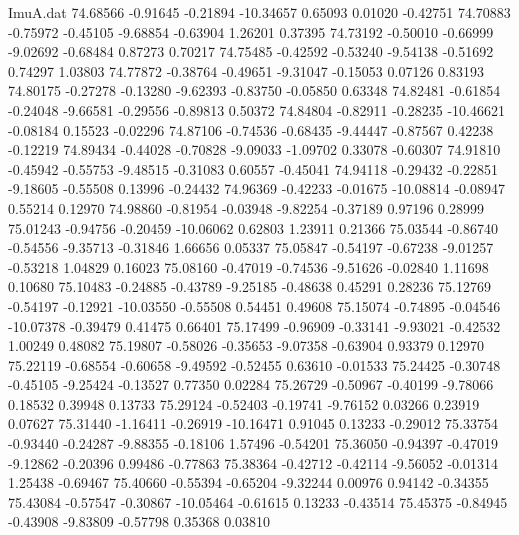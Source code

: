 \begin{filecontents}{ImuA.dat}
  74.68566   -0.91645   -0.21894  -10.34657    0.65093    0.01020   -0.42751
  74.70883   -0.75972   -0.45105   -9.68854   -0.63904    1.26201    0.37395
  74.73192   -0.50010   -0.66999   -9.02692   -0.68484    0.87273    0.70217
  74.75485   -0.42592   -0.53240   -9.54138   -0.51692    0.74297    1.03803
  74.77872   -0.38764   -0.49651   -9.31047   -0.15053    0.07126    0.83193
  74.80175   -0.27278   -0.13280   -9.62393   -0.83750   -0.05850    0.63348
  74.82481   -0.61854   -0.24048   -9.66581   -0.29556   -0.89813    0.50372
  74.84804   -0.82911   -0.28235  -10.46621   -0.08184    0.15523   -0.02296
  74.87106   -0.74536   -0.68435   -9.44447   -0.87567    0.42238   -0.12219
  74.89434   -0.44028   -0.70828   -9.09033   -1.09702    0.33078   -0.60307
  74.91810   -0.45942   -0.55753   -9.48515   -0.31083    0.60557   -0.45041
  74.94118   -0.29432   -0.22851   -9.18605   -0.55508    0.13996   -0.24432
  74.96369   -0.42233   -0.01675  -10.08814   -0.08947    0.55214    0.12970
  74.98860   -0.81954   -0.03948   -9.82254   -0.37189    0.97196    0.28999
  75.01243   -0.94756   -0.20459  -10.06062    0.62803    1.23911    0.21366
  75.03544   -0.86740   -0.54556   -9.35713   -0.31846    1.66656    0.05337
  75.05847   -0.54197   -0.67238   -9.01257   -0.53218    1.04829    0.16023
  75.08160   -0.47019   -0.74536   -9.51626   -0.02840    1.11698    0.10680
  75.10483   -0.24885   -0.43789   -9.25185   -0.48638    0.45291    0.28236
  75.12769   -0.54197   -0.12921  -10.03550   -0.55508    0.54451    0.49608
  75.15074   -0.74895   -0.04546  -10.07378   -0.39479    0.41475    0.66401
  75.17499   -0.96909   -0.33141   -9.93021   -0.42532    1.00249    0.48082
  75.19807   -0.58026   -0.35653   -9.07358   -0.63904    0.93379    0.12970
  75.22119   -0.68554   -0.60658   -9.49592   -0.52455    0.63610   -0.01533
  75.24425   -0.30748   -0.45105   -9.25424   -0.13527    0.77350    0.02284
  75.26729   -0.50967   -0.40199   -9.78066    0.18532    0.39948    0.13733
  75.29124   -0.52403   -0.19741   -9.76152    0.03266    0.23919    0.07627
  75.31440   -1.16411   -0.26919  -10.16471    0.91045    0.13233   -0.29012
  75.33754   -0.93440   -0.24287   -9.88355   -0.18106    1.57496   -0.54201
  75.36050   -0.94397   -0.47019   -9.12862   -0.20396    0.99486   -0.77863
  75.38364   -0.42712   -0.42114   -9.56052   -0.01314    1.25438   -0.69467
  75.40660   -0.55394   -0.65204   -9.32244    0.00976    0.94142   -0.34355
  75.43084   -0.57547   -0.30867  -10.05464   -0.61615    0.13233   -0.43514
  75.45375   -0.84945   -0.43908   -9.83809   -0.57798    0.35368    0.03810

\end{filecontents}
